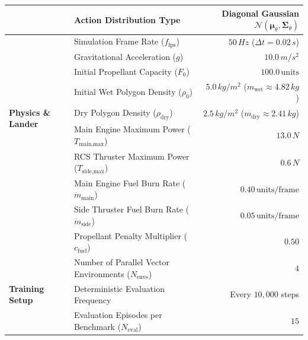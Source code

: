 \begin{table}[H]
\begin{tabularx}{\textwidth}{lXr}
        & Action Distribution Type & Diagonal Gaussian $\mathcal{N}(\boldsymbol{\mu}_\theta, \boldsymbol{\Sigma}_\theta)$ \\
        \midrule
        \multirow{8}{*}{\textbf{Physics \& Lander}} 
        & Simulation Frame Rate ($f_{\text{fps}}$) & $50\,\si{Hz}$ ($\Delta t = 0.02\,\si{s}$) \\
        & Gravitational Acceleration ($g$) & $10.0\,\si{m/s^2}$ \\
        & Initial Propellant Capacity ($F_0$) & $100.0\,\text{units}$ \\
        & Initial Wet Polygon Density ($\rho_0$) & $5.0\,\si{kg/m^2}$ ($m_{\text{wet}} \approx 4.82\,\si{kg}$) \\
        & Dry Polygon Density ($\rho_{\text{dry}}$) & $2.5\,\si{kg/m^2}$ ($m_{\text{dry}} \approx 2.41\,\si{kg}$) \\
        & Main Engine Maximum Power ($T_{\text{main,max}}$) & $13.0\,\si{N}$ \\
        & RCS Thruster Maximum Power ($T_{\text{side,max}}$) & $0.6\,\si{N}$ \\
        & Main Engine Fuel Burn Rate ($\dot{m}_{\text{main}}$) & $0.40\,\text{units/frame}$ \\
        & Side Thruster Fuel Burn Rate ($\dot{m}_{\text{side}}$) & $0.05\,\text{units/frame}$ \\
        & Propellant Penalty Multiplier ($c_{\text{fuel}}$) & $0.50$ \\
        \midrule
        \multirow{3}{*}{\textbf{Training Setup}} 
        & Number of Parallel Vector Environments ($N_{\text{envs}}$) & $4$ \\
        & Deterministic Evaluation Frequency & Every $10{,}000$ steps \\
        & Evaluation Episodes per Benchmark ($N_{\text{eval}}$) & $15$ \\
        \bottomrule
    \end{tabularx}
\end{table}
